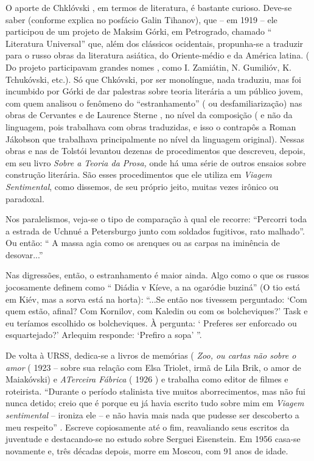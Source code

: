 O aporte de Chklóvski , em termos de literatura, é bastante curioso.
Deve-se saber (conforme explica no posfácio Galin Tihanov), que -- em
1919 -- ele participou de um projeto de Maksim Górki, em Petrogrado,
chamado `` Literatura Universal'' que, além dos clássicos ocidentais,
propunha-se a traduzir para o russo obras da literatura asiática, do
Oriente-médio e da América latina. ( Do projeto participavam grandes
nomes , como I. Zamiátin, N. Gumilióv, K. Tchukóvski, etc.). Só que
Chkóvski, por ser monolíngue, nada traduziu, mas foi incumbido por Górki
de dar palestras sobre teoria literária a um público jovem, com quem
analisou o fenômeno do ``estranhamento'' ( ou desfamiliarização) nas
obras de Cervantes e de Laurence Sterne , no nível da composição ( e não
da linguagem, pois trabalhava com obras traduzidas, e isso o contrapôs a
Roman Jákobson que trabalhava principalmente no nível da linguagem
original). Nessas obras e nas de Tolstói levantou dezenas de
procedimentos que descreveu, depois, em seu livro \emph{Sobre a Teoria
da Prosa,} onde há uma série de outros ensaios sobre construção
literária. São esses procedimentos que ele utiliza em \emph{Viagem
Sentimental}, como dissemos, de seu próprio jeito, muitas vezes irônico
ou paradoxal.

Nos paralelismos, veja-se o tipo de comparação à qual ele recorre:
``Percorri toda a estrada de Uchnué a Petersburgo junto com soldados
fugitivos, rato malhado''. Ou então: `` A massa agia como os arenques ou
as carpas na iminência de desovar...''

Nas digressões, então, o estranhamento é maior ainda. Algo como o que os
russos jocosamente definem como `` Diádia v Kíeve, a na ogaródie
buziná'' (O tio está em Kiév, mas a sorva está na horta): ``...Se então
nos tivessem perguntado: `Com quem estão, afinal? Com Kornilov, com
Kaledin ou com os bolcheviques?' Task e eu teríamos escolhido os
bolcheviques. À pergunta: ` Preferes ser enforcado ou esquartejado?'
Arlequim responde: `Prefiro a sopa' ''.

De volta à URSS, dedica-se a livros de memórias ( \emph{Zoo, ou cartas
não sobre o amor} ( 1923 -- sobre sua relação com Elsa Triolet, irmã de
Lila Brik, o amor de Maiakóvski) e \emph{ATerceira Fábrica} ( 1926 ) e
trabalha como editor de filmes e roteirista. ``Durante o período
stalinista tive muitos aborrecimentos, mas não fui nunca detido; creio
que é porque eu já havia escrito tudo sobre mim em \emph{Viagem
sentimental} -- ironiza ele -- e não havia mais nada que pudesse ser
descoberto a meu respeito'' . Escreve copiosamente até o fim,
reavaliando seus escritos da juventude e destacando-se no estudo sobre
Serguei Eisenstein. Em 1956 casa-se novamente e, três décadas depois,
morre em Moscou, com 91 anos de idade.

